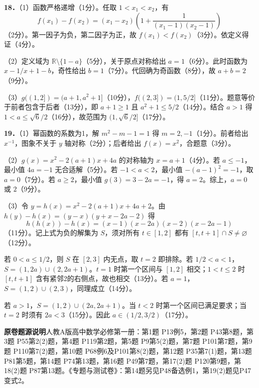 \documentclass[UTF8,a4paper,12pt]{ctexart}
\newcommand{\subq}[1]{\par（#1）}
\newcommand{\q}[1]{\par\textbf{#1．}}
\begin{document}
\newpage
\q{18}（1）函数严格递增（1分）。任取 $1<x_1<x_2$，有
\[
f(x_1)-f(x_2)=(x_1-x_2)\left(1+\frac1{(x_1-1)(x_2-1)}\right)
\]
（2分）。第一因子为负，第二因子为正，故 $f(x_1)<f(x_2)$（3分）。依定义得证（4分）。
\subq{2}定义域为 $\mathbb R\setminus\{1-a\}$（5分），关于原点对称给出 $a=1$（6分）。此时函数为 $x-1/x+1-b$，奇性给出 $b=1$（7分）。代回确为奇函数（8分），故 $a+b=2$（9分）。
\subq{3}$g((1,2])=(a+1,a^2+1]$（10分），$f((2,3])=(1,5/2]$（11分）。题意等价于前者包含于后者（13分），即 $a+1\ge1$ 且 $a^2+1\le5/2$（14分）。结合 $a>1$ 得 $1<a\le\sqrt6/2$（16分），故范围为 $(1,\sqrt6/2]$（17分）。
\q{19}（1）幂函数的系数为1，解 $m^2-m-1=1$ 得 $m=2,-1$（1分）。前者给出 $x^{-1}$，图象不关于 $y$ 轴对称（2分）；后者给出 $f(x)=x^2$，合题意（3分）。
\subq{2}$g(x)=x^2-2(a+1)x+4a$ 的对称轴为 $x=a+1$（4分）。若 $a\le-1$，最小值 $4a=-1$ 无合适解（5分）。若 $-1<a<2$，最小值 $-(a-1)^2=-1$，取 $a=0$（7分）。若 $a\ge2$，最小值 $g(3)=3-2a=-1$，得 $a=2$。综上，$a=0$ 或 $2$（9分）。
\subq{3}令 $y=h(x)=x^2-2(a+1)x+4a+2$。由 $h(y)-h(x)=(y-x)(y+x-2a-2)$ 得
\[
h(h(x))-h(x)=(x-1)(x-2a)(x-2)(x-2a-1)
\]
（11分）。记上式为负的解集为 $S$，须对所有 $t\in[1,2]$ 都有 $[t,t+1]\cap S\ne\varnothing$（12分）。

若 $0<a\le1/2$，则 $S$ 在 $[2,3]$ 内无点，取 $t=2$ 即排除。若 $1/2<a<1$，$S=(1,2a)\cup(2,2a+1)$。$t=1$ 时第一个区间与 $[1,2]$ 相交；$1<t\le2$ 时 $[t,t+1]$ 含有紧邻2的右侧点，故也相交（13分）。若 $a=1$，$S=(1,2)\cup(2,3)$，同理成立（14分）。

若 $a>1$，$S=(1,2)\cup(2a,2a+1)$。当 $t<2$ 时第一个区间已满足要求；当 $t=2$ 时须有 $2a<3$（15分）。因此 $a\in(1/2,3/2)$（17分）。
\par\small\textbf{原卷题源说明}\quad 人教A版高中数学必修第一册：第1题 P13例5，第2题 P43第8题，第3题 P55第2(2)题，第4题 P119第2题，第5题 P9第5(2)题，第7题 P101第7题，第9题 P110第7(2)题，第10题 P68例6及P101第8(2)题，第12题 P35第7(1)题，第13题 P81第5题，第14题 P74第13题，第16题 P49第7题，第17(2)题 P120第9题，第18(2)题 P87第13题。《专题与测试卷》：第14题另见P48备选例1，第19(2)题见P47变式2。
\end{document}
